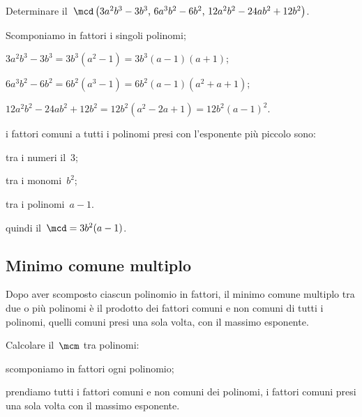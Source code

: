 \begin{exrig}
 \begin{esempio}
Determinare il~$\mcd\left(3a^{2}b^{3}-3b^{3}\text{,~}6a^{3}b^{2}-6b^{2}\text{,~}12a^{2}b^{2}-24ab^{2}+12b^{2}\right)$.
 \begin{itemize*}
 \item Scomponiamo in fattori i singoli polinomi;
  \begin{itemize*}
  \item $3a^{2}b^{3}-3b^{3}=3b^{3}\left(a^{2}-1\right)=3b^{3}(a-1)(a+1)$;
  \item $6a^{3}b^{2}-6b^{2}=6b^{2}\left(a^{3}-1\right)=6b^{2}(a-1)\left(a^{2}+a+1\right)$;
  \item $12a^{2}b^{2}-24ab^{2}+12b^{2}=12b^{2}\left(a^{2}-2a+1\right)=12b^{2}(a-1)^{2}$.
  \end{itemize*}
 \item i fattori comuni a tutti i polinomi presi con l'esponente più piccolo sono:
  \begin{itemize*}
  \item tra i numeri il~$3$;
  \item tra i monomi~$b^{2}$;
  \item tra i polinomi~$a-1$.
  \end{itemize*}
 \item quindi il~$\mcd=3b^{2}(a-1)$.
 \end{itemize*}
 \end{esempio}
\end{exrig}

\subsection{Minimo comune multiplo}
Dopo aver scomposto ciascun polinomio in fattori, il minimo comune multiplo tra due o più polinomi è il prodotto dei fattori comuni
e non comuni di tutti i polinomi, quelli comuni presi una sola volta, con il massimo esponente.

\begin{procedura}
Calcolare il~$\mcm$ tra polinomi:
\begin{enumeratea}
\item scomponiamo in fattori ogni polinomio;
\item prendiamo tutti i fattori comuni e non comuni dei polinomi, i fattori comuni presi una sola
   volta con il massimo esponente.
\end{enumeratea}
\end{procedura}


